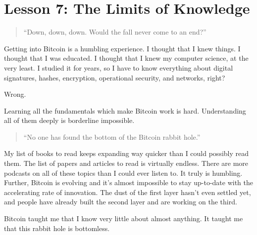 \chapter{Lesson 7: The Limits of Knowledge}
\label{les:7}

\blockquote{
``Down, down, down. Would the fall never come to an end?''
}

Getting into Bitcoin is a humbling experience. I thought that I knew
things. I thought that I was educated. I thought that I knew my computer
science, at the very least. I studied it for years, so I have to know
everything about digital signatures, hashes, encryption, operational
security, and networks, right?

Wrong.

Learning all the fundamentals which make Bitcoin work is hard.
Understanding all of them deeply is borderline impossible.

\begin{quotation}
``No one has found the bottom of the Bitcoin rabbit hole.''
\end{quotation}

My list of books to read keeps expanding way quicker than I could
possibly read them. The list of papers and articles to read is virtually
endless. There are more podcasts on all of these topics than I could
ever listen to. It truly is humbling. Further, Bitcoin is evolving and
it's almost impossible to stay up-to-date with the accelerating rate of
innovation. The dust of the first layer hasn't even settled yet, and
people have already built the second layer and are working on the third.

Bitcoin taught me that I know very little about almost anything. It
taught me that this rabbit hole is bottomless.

%
%
%
%
%
